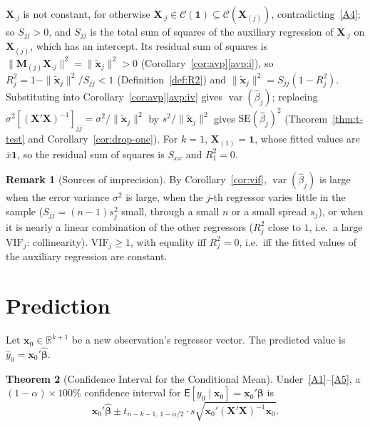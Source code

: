 \documentclass[12pt,a4paper]{article}
\makeatletter
\theoremstyle{definition}
\newtheorem{theorem}{Theorem}[section]
\newtheorem{remark}[theorem]{Remark}
\renewenvironment{proof}[1][\proofname]{\par
  \pushQED{\qed}%
  \normalfont \topsep6\p@\@plus6\p@\relax
  \trivlist
  \item[\hskip\labelsep\bfseries #1\@addpunct{.}]\ignorespaces
}{%
  \popQED\endtrivlist\@endpefalse
}
\newcommand\expc{\mathsf{E}}
\DeclareMathOperator\var{var}
\newcommand{\SE}{\mathrm{SE}}
\newcommand{\bX}{\mathbf{X}}
\newcommand{\bx}{\mathbf{x}}
\def\bb{\boldsymbol{\beta}}
\newcommand{\bM}{\mathbf{M}}
\newcommand{\bone}{\mathbf{1}}
\newcommand{\Real}{\mathbb{R}}
\newcommand{\calC}{\mathcal{C}}
\newcommand{\VIF}{\mathrm{VIF}}
\makeatother
\begin{document}
\begin{proof}
$\bX_{\cdot j}$ is not constant, for otherwise $\bX_{\cdot j} \in \calC(\bone) \subseteq \calC(\bX_{(j)})$, contradicting~\ref{A4}; so $S_{jj} > 0$, and $S_{jj}$ is the total sum of squares of the auxiliary regression of $\bX_{\cdot j}$ on $\bX_{(j)}$, which has an intercept. Its residual sum of squares is $\|\bM_{(j)}\bX_{\cdot j}\|^2 = \|\tilde{\bx}_j\|^2 > 0$ (Corollary~\ref{cor:avp}\ref{avp:i}), so $R_j^2 = 1 - \|\tilde{\bx}_j\|^2/S_{jj} < 1$ (Definition~\ref{def:R2}) and $\|\tilde{\bx}_j\|^2 = S_{jj}(1 - R_j^2)$. Substituting into Corollary~\ref{cor:avp}\ref{avp:iv} gives $\var(\hat\beta_j)$; replacing $\sigma^2[(\bX'\bX)^{-1}]_{jj} = \sigma^2/\|\tilde{\bx}_j\|^2$ by $s^2/\|\tilde{\bx}_j\|^2$ gives $\SE(\hat\beta_j)^2$ (Theorem~\ref{thm:t-test} and Corollary~\ref{cor:drop-one}). For $k = 1$, $\bX_{(1)} = \bone$, whose fitted values are $\bar x\bone$, so the residual sum of squares is $S_{xx}$ and $R_1^2 = 0$.
\end{proof}

\begin{remark}[Sources of imprecision]\label{rem:imprecision}
By Corollary~\ref{cor:vif}, $\var(\hat\beta_j)$ is large when the error variance $\sigma^2$ is large, when the $j$-th regressor varies little in the sample ($S_{jj} = (n-1)s_j^2$ small, through a small $n$ or a small spread $s_j$), or when it is nearly a linear combination of the other regressors ($R_j^2$ close to $1$, i.e.\ a large $\VIF_j$: collinearity). $\VIF_j \geqslant 1$, with equality iff $R_j^2 = 0$, i.e.\ iff the fitted values of the auxiliary regression are constant.
\end{remark}

\section{Prediction}\label{sec:pred}

Let $\bx_0 \in \Real^{k+1}$ be a new observation's regressor vector. The predicted value is $\hat{y}_0 = \bx_0'\hat{\bb}$.

\begin{theorem}[Confidence Interval for the Conditional Mean]\label{thm:ci-mean}
Under~\ref{A1}--\ref{A5}, a $(1-\alpha) \times 100\%$ confidence interval for $\expc[y_0 \mid \bx_0] = \bx_0'\bb$ is
\begin{equation}
\bx_0'\hat{\bb} \pm t_{n-k-1,\,1-\alpha/2} \cdot s\sqrt{\bx_0'(\bX'\bX)^{-1}\bx_0}.
\end{equation}
\end{theorem}
\end{document}
